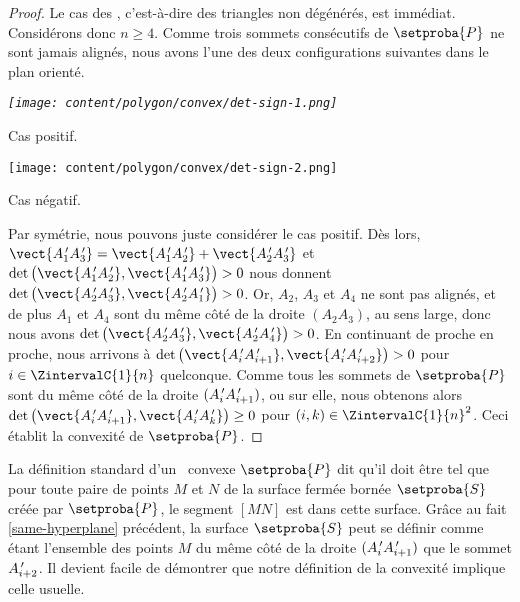 \begin{proof}
	Le cas des , c'est-à-dire des triangles non dégénérés, est immédiat.
	Considérons donc $n \geq 4$.
	Comme trois sommets consécutifs de $\setproba{P}$ ne sont jamais alignés, nous avons l'une des deux configurations suivantes dans le plan orienté. 
    
    \begin{multicols}{2}
        \small\itshape\centering
       	\texttt{[image: content/polygon/convex/det-sign-1.png]}
    	    
    	\smallskip
        Cas positif.
        
        \texttt{[image: content/polygon/convex/det-sign-2.png]}
    	    
    	\smallskip
        Cas négatif.
    \end{multicols}


    Par symétrie, nous pouvons juste considérer le cas positif.
	Dès lors,
	$\vect{\primeit{A}_1 \primeit{A}_3} = \vect{\primeit{A}_1 \primeit{A}_2} + \vect{\primeit{A}_2 \primeit{A}_3}$
	et
	$\det \big( \vect{\primeit{A}_1 \primeit{A}_2}, \vect{\primeit{A}_1 \primeit{A}_3} \big) > 0$
    nous donnent
	$\det \big( \vect{\primeit{A}_2 \primeit{A}_3}, \vect{\primeit{A}_2 \primeit{A}_1} \big) > 0$.
	Or, $A_2$, $A_3$ et $A_4$ ne sont pas alignés, et de plus $A_1$ et $A_4$ sont du même côté de la droite $(A_2 A_3)$, au sens large,
	donc nous avons
	$\det \big( \vect{\primeit{A}_2 \primeit{A}_3}, \vect{\primeit{A}_2 \primeit{A}_4} \big) > 0$.
	En continuant de proche en proche, nous arrivons à
	$\det \big( \vect{\primeit{A}_i \primeit{A}_{i+1}}, \vect{\primeit{A}_i \primeit{A}_{i+2}} \big) > 0$
	pour $i \in \ZintervalC{1}{n}$ quelconque.
	Comme tous les sommets de $\setproba{P}$ sont du même côté de la droite $( A^{\,\prime}_i A^{\,\prime}_{i+1} )$, ou sur elle,
	nous obtenons alors
	$\det \big( \vect{\primeit{A}_i \primeit{A}_{i+1}}, \vect{\primeit{A}_i \primeit{A}_k} \big) \geq 0$
	pour $(i, k) \in \ZintervalC{1}{n}^2$.
	Ceci établit la convexité de $\setproba{P}$.
\end{proof}




\begin{remark}
    La définition standard d'un \ngone\ convexe $\setproba{P}$ dit qu'il doit être tel que pour toute paire de points $M$ et $N$ de la surface fermée bornée $\setproba{S}$ créée par $\setproba{P}$, le segment $[MN]$ est dans cette surface.
    Grâce au fait \ref{same-hyperplane} précédent, la surface $\setproba{S}$ peut se définir comme étant l'ensemble des points $M$ du même côté de la droite $( A^{\,\prime}_i A^{\,\prime}_{i+1} )$ que le sommet $A^{\,\prime}_{i+2}$.
    Il devient facile de démontrer que notre définition de la convexité implique celle usuelle. 
\end{remark}
